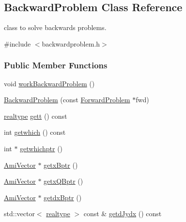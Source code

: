 \hypertarget{classamici_1_1_backward_problem}{}\subsection{Backward\+Problem Class Reference}
\label{classamici_1_1_backward_problem}


class to solve backwards problems.  




{\ttfamily \#include $<$backwardproblem.\+h$>$}

\subsubsection*{Public Member Functions}
\begin{DoxyCompactItemize}
\item 
void \mbox{\hyperlink{classamici_1_1_backward_problem_a4a17093ee76348cce97b06c94bf518bd}{work\+Backward\+Problem}} ()
\item 
\mbox{\hyperlink{classamici_1_1_backward_problem_a173995c3ce3a4c59d815dfbeebb8dc6e}{Backward\+Problem}} (const \mbox{\hyperlink{classamici_1_1_forward_problem}{Forward\+Problem}} $\ast$fwd)
\item 
\mbox{\hyperlink{namespaceamici_a1bdce28051d6a53868f7ccbf5f2c14a3}{realtype}} \mbox{\hyperlink{classamici_1_1_backward_problem_a1582a658df3f51a8c88b6f22b4205b3f}{gett}} () const
\item 
int \mbox{\hyperlink{classamici_1_1_backward_problem_ac337bf2284c1febeb302019b06c54c3e}{getwhich}} () const
\item 
int $\ast$ \mbox{\hyperlink{classamici_1_1_backward_problem_a209a0d59a5a5eebfba1e6db5cb209132}{getwhichptr}} ()
\item 
\mbox{\hyperlink{classamici_1_1_ami_vector}{Ami\+Vector}} $\ast$ \mbox{\hyperlink{classamici_1_1_backward_problem_afd910c853cb52a19b17ff8b65832fe2e}{getx\+Bptr}} ()
\item 
\mbox{\hyperlink{classamici_1_1_ami_vector}{Ami\+Vector}} $\ast$ \mbox{\hyperlink{classamici_1_1_backward_problem_a6b43b17396089785a111a5bc1fd27112}{getx\+Q\+Bptr}} ()
\item 
\mbox{\hyperlink{classamici_1_1_ami_vector}{Ami\+Vector}} $\ast$ \mbox{\hyperlink{classamici_1_1_backward_problem_ab1f652d5ffaf80adab677b0a8393b48a}{getdx\+Bptr}} ()
\item 
std\+::vector$<$ \mbox{\hyperlink{namespaceamici_a1bdce28051d6a53868f7ccbf5f2c14a3}{realtype}} $>$ const  \& \mbox{\hyperlink{classamici_1_1_backward_problem_aaa2f33176422b55808979bfc7ceb2573}{getd\+Jydx}} () const
\end{DoxyCompactItemize}


